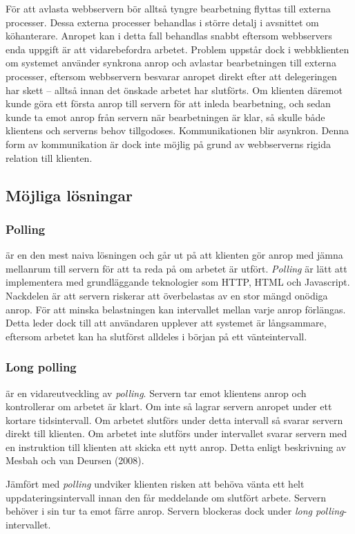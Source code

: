 För att avlasta webbservern bör alltså tyngre bearbetning flyttas till externa processer. Dessa externa processer behandlas i större detalj i avsnittet om köhanterare.
Anropet kan i detta fall behandlas snabbt eftersom webbservers enda uppgift är att vidarebefordra arbetet. Problem uppstår dock i webbklienten om systemet använder synkrona anrop och avlastar bearbetningen till externa processer, eftersom webbservern besvarar anropet direkt efter att delegeringen har skett – alltså innan det önskade arbetet har slutförts.
Om klienten däremot kunde göra ett första anrop till servern för att inleda bearbetning, och sedan kunde ta emot anrop från servern när bearbetningen är klar, så skulle både klientens och serverns behov tillgodoses. Kommunikationen blir asynkron. Denna form av kommunikation är dock inte möjlig på grund av webbserverns rigida relation till klienten.


\subsection{Möjliga lösningar}

\subsubsection{Polling} är en den mest naiva lösningen och går ut på att klienten gör anrop med jämna mellanrum till servern för att ta reda på om arbetet är utfört. \emph{Polling} är lätt att implementera med grundläggande teknologier som HTTP, HTML och Javascript. Nackdelen är att servern riskerar att överbelastas av en stor mängd onödiga anrop. För att minska belastningen kan intervallet mellan varje anrop förlängas. Detta leder dock till att användaren upplever att systemet är långsammare, eftersom arbetet kan ha slutförst alldeles i början på ett vänteintervall.

\subsubsection{Long polling} är en vidareutveckling av \emph{polling}. Servern tar emot klientens anrop och kontrollerar om arbetet är klart. Om inte så lagrar servern anropet under ett kortare tidsintervall. Om arbetet slutförs under detta intervall så svarar servern direkt till klienten. Om arbetet inte slutförs under intervallet svarar servern med en instruktion till klienten att skicka ett nytt anrop. Detta enligt beskrivning av Mesbah och van Deursen (2008). 

Jämfört med \emph{polling} undviker klienten risken att behöva vänta ett helt uppdateringsintervall innan den får meddelande om slutfört arbete. Servern behöver i sin tur ta emot färre anrop. Servern blockeras dock under \emph{long polling}-intervallet.

